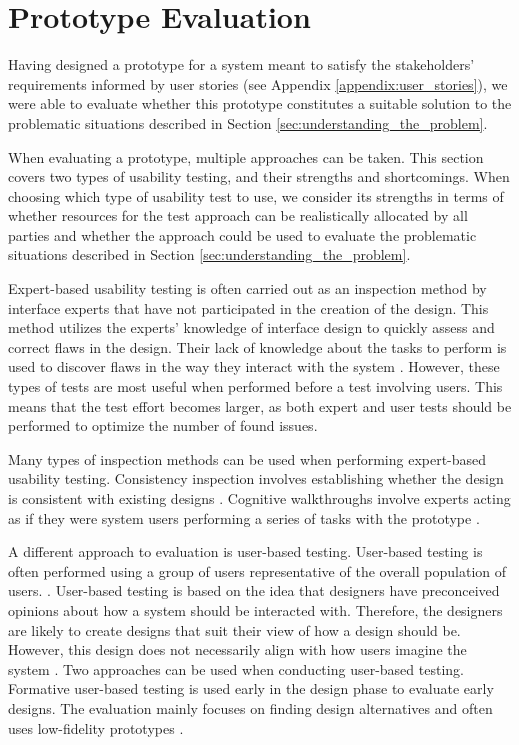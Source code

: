\section{Prototype Evaluation}\label{sec:prototype_evaluation}
Having designed a prototype for a system meant to satisfy the stakeholders' requirements informed by user stories (see Appendix \ref{appendix:user_stories}), we were able to evaluate whether this prototype constitutes a suitable solution to the problematic situations described in Section \ref{sec:understanding_the_problem}.

When evaluating a prototype, multiple approaches can be taken.
This section covers two types of usability testing, and their strengths and shortcomings.
When choosing which type of usability test to use, we consider its strengths in terms of whether resources for the test approach can be realistically allocated by all parties and whether the approach could be used to evaluate the problematic situations described in Section \ref{sec:understanding_the_problem}.

Expert-based usability testing is often carried out as an inspection method \cite{NJ_InspectionMethods} by interface experts that have not participated in the creation of the design.
This method utilizes the experts' knowledge of interface design to quickly assess and correct flaws in the design.
Their lack of knowledge about the tasks to perform is used to discover flaws in the way they interact with the system \cite{researchmethodsinhumancomputerinteraction}.
However, these types of tests are most useful when performed before a test involving users\cite{lazar2005web}. 
This means that the test effort becomes larger, as both expert and user tests should be performed to optimize the number of found issues. \cite{researchmethodsinhumancomputerinteraction} 

Many types of inspection methods can be used when performing expert-based usability testing.
Consistency inspection involves establishing whether the design is consistent with existing designs \cite{NJ_InspectionMethods,wixon_consistencyInspections}.  
Cognitive walkthroughs involve experts acting as if they were system users performing a series of tasks with the prototype \cite{Hollingsed_cognitive_walthrough}.

A different approach to evaluation is user-based testing.
User-based testing is often performed using a group of users representative of the overall population of users. \cite{researchmethodsinhumancomputerinteraction}.
User-based testing is based on the idea that designers have preconceived opinions about how a system should be interacted with. 
Therefore, the designers are likely to create designs that suit their view of how a design should be.
However, this design does not necessarily align with how users imagine the system \cite{user-centred-design,researchmethodsinhumancomputerinteraction}.
Two approaches can be used when conducting user-based testing. 
Formative user-based testing is used early in the design phase to evaluate early designs. 
The evaluation mainly focuses on finding design alternatives and often uses low-fidelity prototypes \cite{dumasAndFox_formative_usability_testing}.

